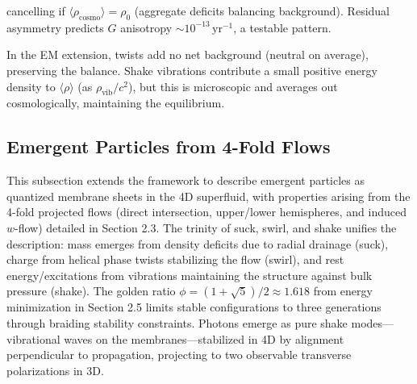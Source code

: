 cancelling if $\langle \rho_\text{cosmo} \rangle = \rho_0$ (aggregate deficits balancing background). Residual asymmetry predicts $G$ anisotropy $\sim 10^{-13} \,\mathrm{yr}^{-1}$, a testable pattern.

In the EM extension, twists add no net background (neutral on average), preserving the balance. Shake vibrations contribute a small positive energy density to $\langle \rho \rangle$ (as $\rho_{\text{vib}} / c^2$), but this is microscopic and averages out cosmologically, maintaining the equilibrium.

\medskip
\noindent
{}
\medskip

\subsection{Emergent Particles from 4-Fold Flows}

This subsection extends the framework to describe emergent particles as quantized membrane sheets in the 4D superfluid, with properties arising from the 4-fold projected flows (direct intersection, upper/lower hemispheres, and induced $w$-flow) detailed in Section 2.3. The trinity of suck, swirl, and shake unifies the description: mass emerges from density deficits due to radial drainage (suck), charge from helical phase twists stabilizing the flow (swirl), and rest energy/excitations from vibrations maintaining the structure against bulk pressure (shake). The golden ratio $\phi = (1 + \sqrt{5})/2 \approx 1.618$ from energy minimization in Section 2.5 limits stable configurations to three generations through braiding stability constraints. Photons emerge as pure shake modes---vibrational waves on the membranes---stabilized in 4D by alignment perpendicular to propagation, projecting to two observable transverse polarizations in 3D.

